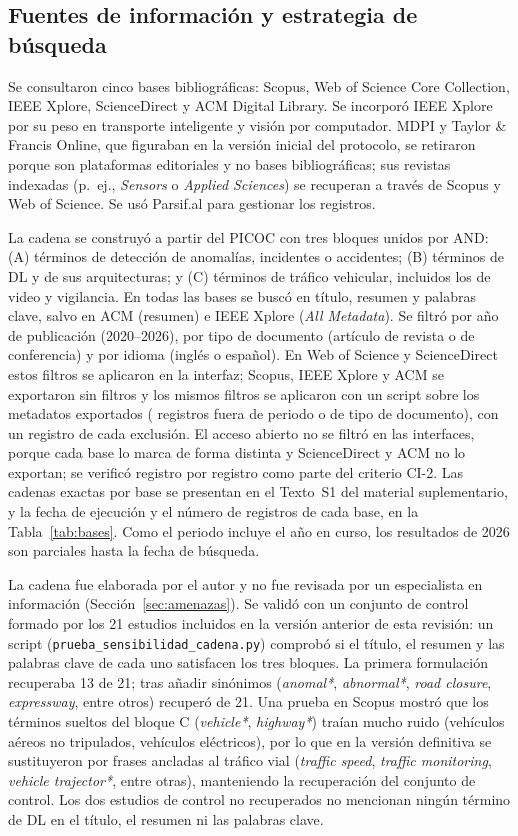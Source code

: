 \documentclass[12pt, a4paper]{article}
\begin{document}
\subsection{Fuentes de información y estrategia de búsqueda}
\label{sec:busqueda}

Se consultaron cinco bases bibliográficas: Scopus, Web of Science Core Collection, IEEE Xplore, ScienceDirect y ACM Digital Library. Se incorporó IEEE Xplore por su peso en transporte inteligente y visión por computador. MDPI y Taylor \& Francis Online, que figuraban en la versión inicial del protocolo, se retiraron porque son plataformas editoriales y no bases bibliográficas; sus revistas indexadas (p.~ej., \textit{Sensors} o \textit{Applied Sciences}) se recuperan a través de Scopus y Web of Science. Se usó Parsif.al para gestionar los registros.

La cadena se construyó a partir del PICOC con tres bloques unidos por AND: (A) términos de detección de anomalías, incidentes o accidentes; (B) términos de DL y de sus arquitecturas; y (C) términos de tráfico vehicular, incluidos los de video y vigilancia. En todas las bases se buscó en título, resumen y palabras clave, salvo en ACM (resumen) e IEEE Xplore (\textit{All Metadata}). Se filtró por año de publicación (2020--2026), por tipo de documento (artículo de revista o de conferencia) y por idioma (inglés o español). En Web of Science y ScienceDirect estos filtros se aplicaron en la interfaz; Scopus, IEEE Xplore y ACM se exportaron sin filtros y los mismos filtros se aplicaron con un script sobre los metadatos exportados (\NFueraFiltros{} registros fuera de periodo o de tipo de documento), con un registro de cada exclusión. El acceso abierto no se filtró en las interfaces, porque cada base lo marca de forma distinta y ScienceDirect y ACM no lo exportan; se verificó registro por registro como parte del criterio CI-2. Las cadenas exactas por base se presentan en el Texto~S1 del material suplementario, y la fecha de ejecución y el número de registros de cada base, en la Tabla~\ref{tab:bases}. Como el periodo incluye el año en curso, los resultados de 2026 son parciales hasta la fecha de búsqueda.

La cadena fue elaborada por el autor y no fue revisada por un especialista en información (Sección~\ref{sec:amenazas}). Se validó con un conjunto de control formado por los 21 estudios incluidos en la versión anterior de esta revisión: un script (\texttt{prueba\_sensibilidad\_cadena.py}) comprobó si el título, el resumen y las palabras clave de cada uno satisfacen los tres bloques. La primera formulación recuperaba 13 de 21; tras añadir sinónimos (\textit{anomal*}, \textit{abnormal*}, \textit{road closure}, \textit{expressway}, entre otros) recuperó \NsensibOK{} de 21. Una prueba en Scopus mostró que los términos sueltos del bloque C (\textit{vehicle*}, \textit{highway*}) traían mucho ruido (vehículos aéreos no tripulados, vehículos eléctricos), por lo que en la versión definitiva se sustituyeron por frases ancladas al tráfico vial (\textit{traffic speed}, \textit{traffic monitoring}, \textit{vehicle trajector*}, entre otras), manteniendo la recuperación del conjunto de control. Los dos estudios de control no recuperados no mencionan ningún término de DL en el título, el resumen ni las palabras clave.
\end{document}
